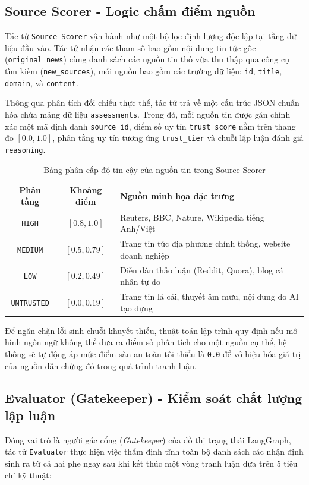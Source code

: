\documentclass[12pt,a4paper]{report}
\begin{document}
\subsection{Source Scorer - Logic chấm điểm nguồn}
Tác tử \texttt{Source Scorer} vận hành như một bộ lọc định lượng độc lập tại tầng dữ liệu đầu vào. Tác tử nhận các tham số bao gồm nội dung tin tức gốc (\texttt{original\_news}) cùng danh sách các nguồn tin thô vừa thu thập qua công cụ tìm kiếm (\texttt{new\_sources}), mỗi nguồn bao gồm các trường dữ liệu: \texttt{id}, \texttt{title}, \texttt{domain}, và \texttt{content}. 

Thông qua phân tích đối chiếu thực thể, tác tử trả về một cấu trúc JSON chuẩn hóa chứa mảng dữ liệu \texttt{assessments}. Trong đó, mỗi nguồn tin được gán chính xác một mã định danh \texttt{source\_id}, điểm số uy tín \texttt{trust\_score} nằm trên thang đo $[0.0, 1.0]$, phân tầng uy tín tương ứng \texttt{trust\_tier} và chuỗi lập luận đánh giá \texttt{reasoning}.

\begin{table}[h!]
\centering
\caption{Bảng phân cấp độ tin cậy của nguồn tin trong Source Scorer}
\label{tab:trust_tiers}
\begin{tabular}{|c|c|p{6cm}|}
\hline
\textbf{Phân tầng} & \textbf{Khoảng điểm} & \textbf{Nguồn minh họa đặc trưng} \\ \hline
\texttt{HIGH} & $[0.8, 1.0]$ & Reuters, BBC, Nature, Wikipedia tiếng Anh/Việt \\ \hline
\texttt{MEDIUM} & $[0.5, 0.79]$ & Trang tin tức địa phương chính thống, website doanh nghiệp \\ \hline
\texttt{LOW} & $[0.2, 0.49]$ & Diễn đàn thảo luận (Reddit, Quora), blog cá nhân tự do \\ \hline
\texttt{UNTRUSTED} & $[0.0, 0.19]$ & Trang tin lá cải, thuyết âm mưu, nội dung do AI tạo dựng \\ \hline
\end{tabular}
\end{table}

Để ngăn chặn lỗi sinh chuỗi khuyết thiếu, thuật toán lập trình quy định nếu mô hình ngôn ngữ không thể đưa ra điểm số phân tích cho một nguồn cụ thể, hệ thống sẽ tự động áp mức điểm sàn an toàn tối thiểu là \texttt{0.0} để vô hiệu hóa giá trị của nguồn dẫn chứng đó trong quá trình tranh luận.

\subsection{Evaluator (Gatekeeper) - Kiểm soát chất lượng lập luận}
Đóng vai trò là người gác cổng (\textit{Gatekeeper}) của đồ thị trạng thái LangGraph, tác tử \texttt{Evaluator} thực hiện việc thẩm định tĩnh toàn bộ danh sách các nhận định sinh ra từ cả hai phe ngay sau khi kết thúc một vòng tranh luận dựa trên 5 tiêu chí kỹ thuật:
\end{document}
